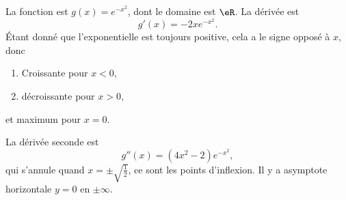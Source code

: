 \begin{corrige}{5}

La fonction est $g(x)= e^{-x^2}$, dont le domaine est $\eR$. La dérivée est
\begin{equation}
	g'(x)=-2x e^{-x^2}.
\end{equation}
Étant donné que l'exponentielle est toujours positive, cela a le signe opposé à $x$, donc
\begin{enumerate}

\item
Croissante pour $x<0$,
\item décroissante pour $x>0$,
\end{enumerate}
et maximum pour $x=0$.

La dérivée seconde est
\begin{equation}
	g''(x)=(4x^2-2) e^{-x^2},
\end{equation}
qui s'annule quand $x=\pm\sqrt{\frac{ 1 }{ 2 }}$, ce sont les points d'inflexion. Il y a asymptote horizontale  $y=0$ en $\pm\infty$.

%


\end{corrige}
